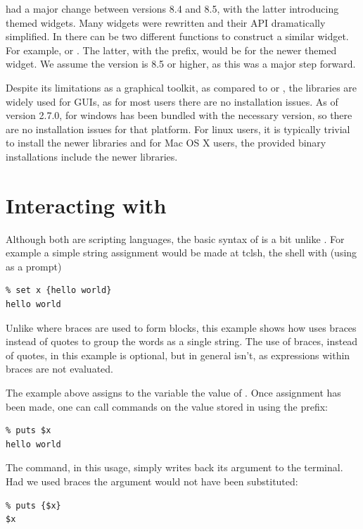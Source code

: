 \TK\/ had a major change between versions 8.4 and 8.5, with the latter
introducing themed widgets. Many widgets were rewritten and their API
dramatically simplified. In  there can be two different
functions to construct a similar widget. For example,
 or . The latter, with the
 prefix, would be for the newer themed widget. We assume the
\TK\/ version is 8.5 or higher, as this was a major step forward. 

Despite its limitations as a graphical toolkit, as compared to \GTK\/
or \Qt, the \TK\/ libraries are widely used for \R\/ GUIs, as for most
users there are no installation issues. As of version 2.7.0, \R\/ for
windows has been bundled with the necessary \TK\/ version, so there are no
installation issues for that platform. For linux users, it is
typically trivial to install the newer libraries and for Mac OS X
users, the provided binary installations include the newer \TK\/ libraries.




\section{Interacting with \TCL}
\label{sec:tcltk:interacting-with-tcl}


Although both are scripting languages, the basic syntax of \TCL\/ is a bit unlike \R. For
example a simple string assignment would be made at tclsh, the \TCL\/
shell with (using \code{\%} as a prompt)
\begin{verbatim}
% set x {hello world}
hello world
\end{verbatim}
Unlike \R\/ where braces are used to form blocks, this example shows
how \TCL\/ uses braces instead of quotes to group the words as a
single string. The use of braces, instead of quotes, in this example
is optional, but in general isn't, as expressions within braces are
not evaluated.  

The example above assigns to the variable  the
value of . Once assignment has been made, one can
call commands on the value stored in  using the \code{\$}
prefix:
\begin{verbatim}
% puts $x
hello world
\end{verbatim}
The  command, in this usage, simply writes back its argument to the terminal. Had
we used braces the argument would not have been substituted:
\begin{verbatim}
% puts {$x}
$x
\end{verbatim}

